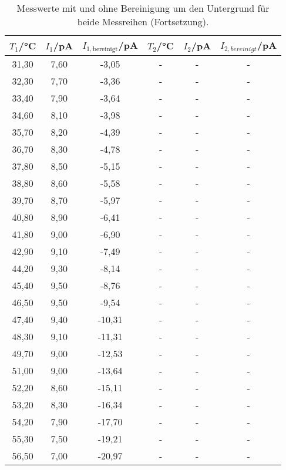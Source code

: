 \begin{table}[htp]
	\begin{center}
    \caption{Messwerte mit und ohne Bereinigung um den Untergrund für beide Messreihen (Fortsetzung).}
    \label{tab:messwerte3}
		\begin{tabular}{cccccc}
		\toprule
			{$T_1$/°C} & {$I_1$/pA} & {$I_{1,\text{bereinigt}}$/pA} & {$T_2$/°C} & {$I_2$/pA} & {$I_{2,bereinigt}$/pA}\\
			\midrule
			31,30 & 7,60 & -3,05  & - & - & -\\
			32,30 & 7,70 & -3,36  & - & - & -\\
			33,40 & 7,90 & -3,64  & - & - & -\\
			34,60 & 8,10 & -3,98  & - & - & -\\
			35,70 & 8,20 & -4,39  & - & - & -\\
			36,70 & 8,30 & -4,78  & - & - & -\\
			37,80 & 8,50 & -5,15  & - & - & -\\
			38,80 & 8,60 & -5,58  & - & - & -\\
			39,70 & 8,70 & -5,97  & - & - & -\\
			40,80 & 8,90 & -6,41  & - & - & -\\
			41,80 & 9,00 & -6,90  & - & - & -\\
			42,90 & 9,10 & -7,49  & - & - & -\\
			44,20 & 9,30 & -8,14  & - & - & -\\
			45,40 & 9,50 & -8,76  & - & - & -\\
			46,50 & 9,50 & -9,54  & - & - & -\\
			47,40 & 9,40 & -10,31 & - & - & -\\
			48,30 & 9,10 & -11,31 & - & - & -\\
			49,70 & 9,00 & -12,53 & - & - & -\\
			51,00 & 9,00 & -13,64 & - & - & -\\
			52,20 & 8,60 & -15,11 & - & - & -\\
			53,20 & 8,30 & -16,34 & - & - & -\\
			54,20 & 7,90 & -17,70 & - & - & -\\
			55,30 & 7,50 & -19,21 & - & - & -\\
			56,50 & 7,00 & -20,97 & - & - & -\\
		\bottomrule
		\end{tabular}
	\end{center}
\end{table}

\newpage
